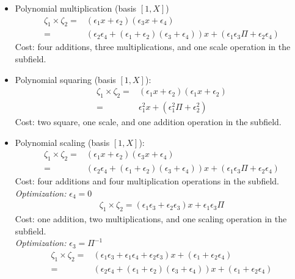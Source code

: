 \begin{itemize}
	\item Polynomial multiplication (basis $[1, X]$)
	\begin{align*}
	\zeta_1 \times \zeta_2 = & (\epsilon_1 x + \epsilon_2)(\epsilon_3 x + \epsilon_4) \\
	= & (\epsilon_2\epsilon_4 + (\epsilon_1 + \epsilon_2)(\epsilon_3 + \epsilon_4))x + (\epsilon_1\epsilon_3\Pi + \epsilon_2\epsilon_4)
	\end{align*}
	Cost: four additions, three multiplications, and one scale operation in the subfield. \\
	\item Polynomial squaring (basis $[1, X]$): 
	\begin{align*}
	\zeta_1 \times \zeta_2 = & (\epsilon_1 x + \epsilon_2)(\epsilon_1 x + \epsilon_2) \\
	= & \epsilon_1^2 x + (\epsilon_1^2\Pi + \epsilon_2^2)
	\end{align*}
	Cost: two square, one scale, and one addition operation in the subfield. \\
	\item Polynomial scaling (basis $[1, X]$): 
	\begin{align*}
	\zeta_1 \times \zeta_2 = & (\epsilon_1 x + \epsilon_2)(\epsilon_3 x + \epsilon_4)\\
	= & (\epsilon_2\epsilon_4 + (\epsilon_1 + \epsilon_2)(\epsilon_3 + \epsilon_4)) x + (\epsilon_1\epsilon_3\Pi + \epsilon_2\epsilon_4)
	\end{align*}
	Cost: four additions and four multiplication operations in the subfield. \\
	\emph{Optimization:} $\epsilon_4 = 0$
	\begin{align*}
	\zeta_1 \times \zeta_2 = (\epsilon_1\epsilon_3 + \epsilon_2\epsilon_3)x + \epsilon_1\epsilon_3\Pi
	\end{align*}
	Cost: one addition, two multiplications, and one scaling operation in the subfield. \\
	\emph{Optimization:} $\epsilon_3 = \Pi^{-1}$
	\begin{align*}
	\zeta_1 \times \zeta_2 = & (\epsilon_1\epsilon_3 + \epsilon_1\epsilon_4 + \epsilon_2\epsilon_3) x + (\epsilon_1 + \epsilon_2\epsilon_4) \\
	= & (\epsilon_2\epsilon_4 + (\epsilon_1 + \epsilon_2)(\epsilon_3 + \epsilon_4)) x + (\epsilon_1 + \epsilon_2\epsilon_4) 
	\end{align*}

\end{itemize}
